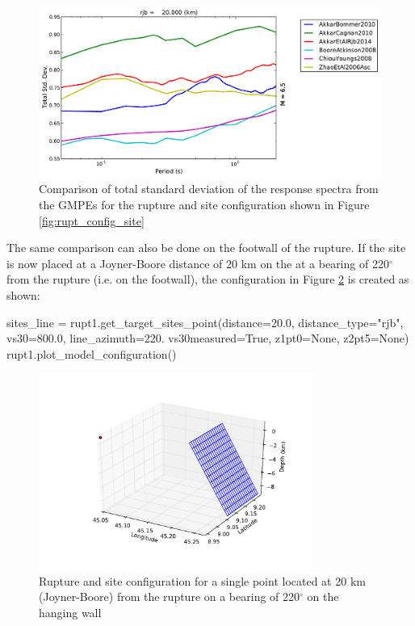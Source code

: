 \begin{figure}[htb]
	\centering
		\includegraphics[width=\textwidth]{./figures/trellis/spectra_sigma_trellis_rupt.pdf}
	\caption{Comparison of total standard deviation of the response spectra from the GMPEs for the rupture and site configuration shown in Figure \ref{fig:rupt_config_site}}
	\label{fig:spectra_sigma_trellis_rupt}
\end{figure}

The same comparison can also be done on the footwall of the rupture. If the site is now placed at a Joyner-Boore distance of 20 km on the at a bearing of 220$^{\circ}$ from the rupture (i.e. on the footwall), the configuration in Figure \ref{fig:rupt_config_footwall_site} is created as shown:

\begin{python}
sites_line = rupt1.get_target_sites_point(distance=20.0,
                                          distance_type="rjb",
                                          vs30=800.0,
                                          line_azimuth=220.
                                          vs30measured=True,
                                          z1pt0=None,
                                          z2pt5=None)
rupt1.plot_model_configuration()
\end{python}

\begin{figure}[htbp]
	\centering
		\includegraphics[width=9cm]{./figures/trellis/rupture_config_footwall_site.pdf}
	\caption{Rupture and site configuration for a single point located at 20 km (Joyner-Boore) from the rupture on a bearing of 220$^{\circ}$ on the hanging wall}
	\label{fig:rupt_config_footwall_site}
\end{figure}

